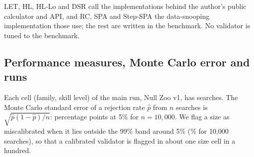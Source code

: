 LET, HL, HL-Lo and DSR call the implementations behind the author's public calculator and API, and RC, SPA and Step-SPA the data-snooping implementation those use; the rest are written in the benchmark. No validator is tuned to the benchmark.

\subsection{Performance measures, Monte Carlo error and runs}
Each cell (family, skill level) of the main run, Null Zoo v1, has  searches. The Monte Carlo standard error of a rejection rate $\hat p$ from $n$ searches is $\sqrt{\hat p(1-\hat p)/n}$:  percentage points at 5\% for $n=10{,}000$. We flag a size as miscalibrated when it lies outside the 99\% band around 5\% (\% for 10,000 searches), so that a calibrated validator is flagged in about one size cell in a hundred.


